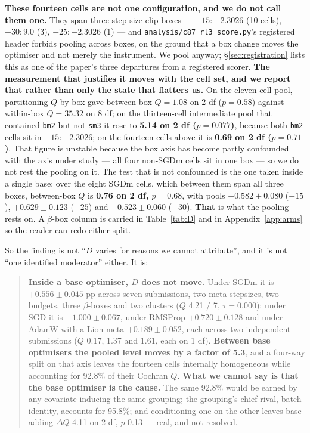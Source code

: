 \documentclass[10pt,letterpaper]{article}
\newcommand{\Dstat}{D}                         %
\newcommand{\arm}[1]{\texttt{#1}}
\begin{document}
\textbf{These fourteen cells are not one configuration, and we do not call them one.} They span
three step-size clip boxes --- $-15{:}{-}2.3026$ (10 cells), $-30{:}9.0$ (3),
$-25{:}{-}2.3026$ (1) --- and \texttt{analysis/c87\_rl3\_score.py}'s registered header forbids
pooling across boxes, on the ground that a box change moves the optimiser and not merely the
instrument. We pool anyway; \S\ref{sec:registration} lists this as one of the paper's three
departures from a registered scorer. \textbf{The measurement that justifies it moves with the
cell set, and we report that rather than only the state that flatters us.} On the eleven-cell
pool, partitioning $Q$ by box gave between-box $Q = 1.08$ on 2 df ($p = 0.58$) against within-box
$Q = 35.32$ on 8 df; on the thirteen-cell intermediate pool that contained \arm{bm2} but not
\arm{sm3} it rose to \textbf{5.14 on 2 df ($p = 0.077$)}, because both \arm{bm2} cells sit in
$-15{:}{-}2.3026$; on the fourteen cells above it is \textbf{0.69 on 2 df ($p = 0.71$)}. That
figure is unstable because the box axis has become partly confounded with the axis under study
--- all four non-SGDm cells sit in one box --- so we do not rest the pooling on it. The test that
is not confounded is the one taken inside a single base: over the eight SGDm cells, which between
them span all three boxes, between-box $Q$ is \textbf{0.76 on 2 df, $p = 0.68$}, with pools
$+0.582 \pm 0.080$ ($-15$), $+0.629 \pm 0.123$ ($-25$) and $+0.523 \pm 0.060$ ($-30$).
\textbf{That} is what the pooling rests on. A $\beta$-box column is carried in Table~\ref{tab:D}
and in Appendix~\ref{app:arms} so the reader can redo either split.

So the finding is not ``$\Dstat$ varies for reasons we cannot attribute'', and it is not ``one
identified moderator'' either. It is:

\begin{quote}
\textbf{Inside a base optimiser, $\Dstat$ does not move.} Under SGDm it is $+0.556 \pm 0.045$
pp across seven submissions, two meta-stepsizes, two budgets, three $\beta$-boxes and two
clusters ($Q$ 4.21 / 7, $\tau = 0.000$); under SGD it is $+1.000 \pm 0.067$, under RMSProp
$+0.720 \pm 0.128$ and under AdamW with a Lion meta $+0.189 \pm 0.052$, each across two
independent submissions ($Q$ 0.17, 1.37 and 1.61, each on 1 df).
\textbf{Between base optimisers the pooled level moves by a factor of 5.3}, and a four-way split
on that axis leaves the fourteen cells internally homogeneous while accounting for 92.8\% of
their Cochran $Q$. \textbf{What we cannot say is that the base optimiser is the cause.} The same
92.8\% would be earned by any covariate inducing the same grouping; the grouping's chief rival,
batch identity, accounts for 95.8\%; and conditioning one on the other leaves base adding
$\Delta Q$ 4.11 on 2 df, $p$ 0.13 --- real, and not resolved.
\end{quote}
\end{document}

